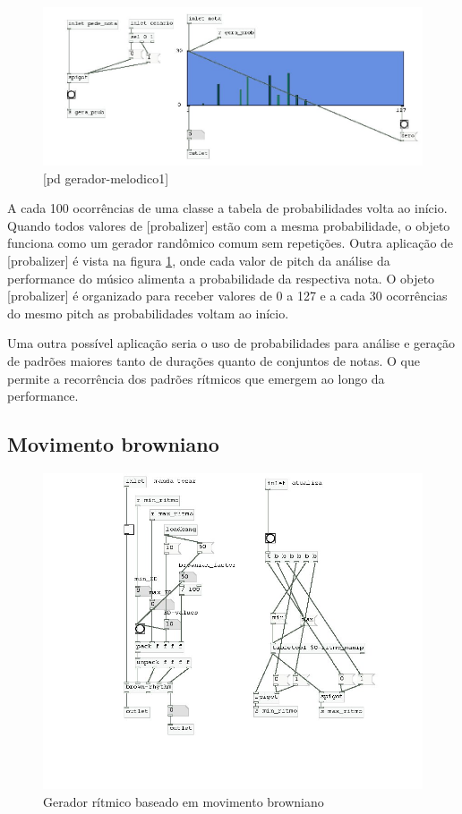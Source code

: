 \documentclass{ppgmus}
\begin{document}
\begin{figure}
\includegraphics[scale=.6]{gera-melodico1}
\caption{[pd gerador-melodico1]}
\label{gera-melodico1}
\end{figure}  

A cada 100 ocorrências de uma classe a tabela
de probabilidades volta ao início. Quando todos valores de [probalizer] estão
com a mesma probabilidade, o objeto funciona como um gerador randômico comum sem
repetições.
Outra aplicação de [probalizer] é vista na figura \ref{gera-melodico1},
onde cada valor de pitch da análise da performance do músico alimenta
a probabilidade da respectiva nota. O objeto [probalizer] é organizado
para receber valores de 0 a 127 e a cada 30 ocorrências do mesmo
pitch as probabilidades voltam ao início.


Uma outra possível aplicação seria o uso de probabilidades para
análise e geração de padrões maiores tanto de durações quanto de conjuntos
de notas. O que permite a recorrência dos padrões
rítmicos que emergem ao longo da performance.




\subsection{Movimento browniano}


\begin{figure}
\includegraphics[scale=.6]{gerador-ritmico2}
\caption{Gerador rítmico baseado em movimento browniano}
\label{gera-ritmico2}
\end{figure}  
\end{document}
